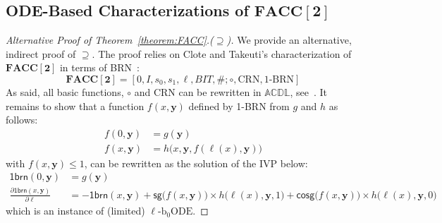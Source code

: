 \documentclass[11pt, oneside]{article}
\newcommand{\longv}[1]{}
\newcommand{\fun}[1]{\mathsf{#1}}
\newcommand{\FACC}{\mathbf{FACC[2]}}
\newcommand{\tu}[1]{\mathbf{#1}}
\newtheorem{theorem}{Theorem}
\theoremstyle{definition}
\newcommand{\ODEACC}{\ell\text{-ODE}_{\text{FACC[2]}}}
\newcommand{\schODE}{\ell\text{-b}_0\text{ODE}}
\begin{document}
\begin{toappendix}
\subsection{ODE-Based Characterizations of $\FACC$}

\begin{proof}[Alternative Proof of Theorem~\ref{theorem:FACC}.($\supseteq$)]
We provide an alternative, indirect proof of $\supseteq$.
The proof relies on Clote and Takeuti's characterization of $\FACC$ in terms of BRN~\cite{CloteTakeuti}:
$$
\FACC = [0, I, s_0, s_1, \ell, BIT, \#; \circ, \text{CRN}, \text{1-BRN}]
$$
As said, all basic functions, $\circ$ and CRN can be rewritten in $\mathbb{ACDL}$, see~\cite{ADK24a}.
It remains to show that a function $f(x, \tu y)$ defined by 1-BRN from $g$ and $h$ as follows:
\begin{align*}
    f(0, \tu y) &= g(\tu y) \\
    f(x, \tu y) &= h\big(x, \tu y, f(\ell(x), \tu y)\big)
\end{align*}
with $f(x, \tu y)\leq 1$, can be rewritten as the solution of the IVP below:
\begin{align*}
    \fun{1brn}(0, \tu y) &= g(\tu y) \\
    \frac{\partial \fun{1brn}(x, \tu y)}{\partial \ell} &= - \fun{1brn}(x, \tu y) + \fun{sg}\big(f(x, \tu y)\big) \times h\big(\ell(x), \tu y, 1\big) + \fun{cosg}\big(f(x, \tu y)\big) \times h\big(\ell(x), \tu y, 0\big)
\end{align*}
which is an instance of (limited) $\schODE$.
\end{proof}



\longv{
\begin{theorem}%
$\FACC
= 
[\fun{0}, \fun{1}, \ell, \fun{sg}, +, -, \div 2, \pi^p_i, \#; \circ, \ell\emph{-ODE}_1, \ell\emph{-ODE}_3, \ODEACC]
$
%
\end{theorem}

\begin{proof}
    $\subseteq$ Following the closure proofs from~\cite{ADK24a} plus Lemma~\ref{lemma:FACCone} and Lemma~\ref{lemma:schODE} for $\ODEACC$ and $\schODE$, respectively.

    $\supseteq$ Consequence of the fact that (unbounded fan-in) \textsc{Mod 2} computation or parity can be simulated by $\ODEACC$ (see Remark~\ref{remark:mod2}).
\end{proof}
}
\end{toappendix}
\end{document}
